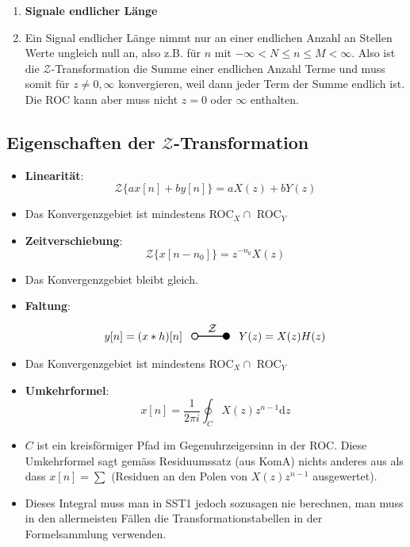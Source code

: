 \documentclass[11pt]{article}
\newcommand{\transform}[2]{%
    \begin{tikzpicture}
        \draw[thick] (0,0) circle (0.1);
        \draw[thick] (0.1,0) -- (#2,0) node[midway, above] {#1};
        \filldraw[thick] (#2,0) circle (0.1);
    \end{tikzpicture}%
}
\begin{document}
\begin{itemize}[leftmargin = 0pt]
\begin{enumerate}
        \item \textbf{Signale endlicher Länge}
        \item[] Ein Signal endlicher Länge nimmt nur an einer endlichen Anzahl an Stellen Werte ungleich null an, also z.B. für $n$ mit $ -\infty < N \leq n \leq M <\infty $. Also ist die $\mathcal{Z}$-Transformation die Summe einer endlichen Anzahl Terme und muss somit für $z\neq 0, \infty $ konvergieren, weil dann jeder Term der Summe endlich ist. Die ROC kann aber muss nicht $z=0$ oder $\infty$ enthalten.
    \end{enumerate}
\end{itemize}

\vspace*{-0.25cm}
\subsection*{Eigenschaften der $\mathcal{Z}$-Transformation}
\vspace*{-0.5cm}
\begin{itemize}
    \item \textbf{Linearität}:
        $$\mathcal{Z}\{ax[n] + by[n]\} = aX(z) + bY(z)$$
    \item[] Das Konvergenzgebiet ist mindestens ROC$_X \cap $ ROC$_Y$
    \item \textbf{Zeitverschiebung}:
        $$\mathcal{Z}\{x[n-n_0]\} = z^{-n_0}X(z)$$
    \item[] Das Konvergenzgebiet bleibt gleich.
    \item \textbf{Faltung}:
        $$y[n] = (x \ast h)[n] \hspace{8pt} \transform{$\mathcal{Z}$}{1} \hspace{8pt} Y(z) = X(z)H(z) $$
    \item[] Das Konvergenzgebiet ist mindestens ROC$_X \cap $ ROC$_Y$
    \item \textbf{Umkehrformel}:
        $$x[n] = \frac{1}{2 \pi i} \oint_C X(z)z^{n-1} \text{d}z$$
    \item[] $C$ ist ein kreisförmiger Pfad im Gegenuhrzeigersinn in der ROC. Diese Umkehrformel sagt gemäss Residuumssatz (aus KomA) nichts anderes aus als dass $x[n] = \sum$ (Residuen an den Polen von $X(z)z^{n-1}$ ausgewertet).
    \item[] Dieses Integral muss man in SST1 jedoch sozusagen nie berechnen, man muss in den allermeisten Fällen die Transformationstabellen in der Formelsammlung verwenden.
\end{itemize}
\end{document}
